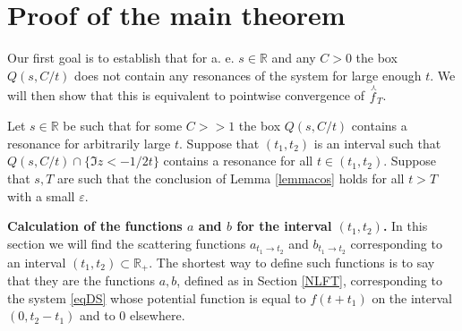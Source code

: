 \documentclass[11pt,twoside,reqno]{amsart}
\def\ti{\tilde}
\def\to{\rightarrow}
\def \nlhat {\overset{\ \curlywedge}}
\def\R{{\mathbb R}}
\def\e{\varepsilon}
\theoremstyle{plain}
\numberwithin{equation}{section}
\begin{document}
%
%
%

\section{Proof of the main theorem} \label{secPMT}

Our first goal is to establish that for a. e. $s\in\R$ and  any $C>0$ the box $Q(s,C/t)$ does not contain any resonances of the system for large enough $t$. We will then show that this is equivalent to pointwise convergence of $\nlhat f_T$.

Let $s\in\R$ be such that for some $C>>1$ the box $Q(s,C/t)$ contains a resonance for arbitrarily large $t$. Suppose that $(t_1,t_2)$ is an interval such 
that $Q(s,C/t)\cap\{\Im z<-1/2t\}$ contains a resonance for all $t\in(t_1,t_2)$. Suppose that $s, T$ are such that
the conclusion of Lemma \ref{lemmacos} holds for all $t>T$
with a small $\e$.


{\bf Calculation of the functions $a$ and $b$ for the interval $(t_1,t_2)$. } 
In this section we will find the scattering functions $a_{t_1 \to t_2}$  and $b_{t_1 \to t_2}$ corresponding to an interval $(t_1,t_2)\subset \R_+$.
The shortest way to define such  functions is to say that they are the functions $a, b$, defined as in Section \ref{NLFT}, corresponding
to the system \eqref{eqDS} whose potential function is equal to $f(t+t_1)$ on the interval $(0, t_2-t_1)$ and to $0$ elsewhere.
\end{document}
